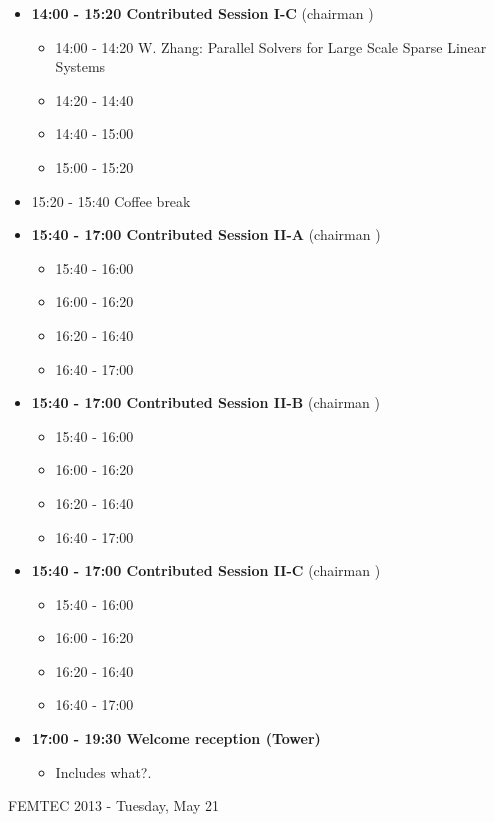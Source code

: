 \documentclass[10pt, A4]{article}%
\begin{document}
\begin{itemize}
\begin{itemize}
  \end{itemize}
    \item {\bf 14:00 - 15:20 Contributed Session I-C} (chairman ) 
  \begin{itemize}
    \item 14:00 - 14:20 {W. Zhang}: {Parallel Solvers for Large Scale Sparse Linear Systems}
    \item 14:20 - 14:40 
    \item 14:40 - 15:00 
    \item 15:00 - 15:20 
  \end{itemize}
  \item 15:20 - 15:40 Coffee break
  \item {\bf 15:40 - 17:00 Contributed Session II-A} (chairman ) 
  \begin{itemize}
    \item 15:40 - 16:00
    \item 16:00 - 16:20 
    \item 16:20 - 16:40 
    \item 16:40 - 17:00 
  \end{itemize}
  \item {\bf 15:40 - 17:00 Contributed Session II-B} (chairman ) 
  \begin{itemize}
    \item 15:40 - 16:00
    \item 16:00 - 16:20 
    \item 16:20 - 16:40 
    \item 16:40 - 17:00 
  \end{itemize}
    \item {\bf 15:40 - 17:00 Contributed Session II-C} (chairman ) 
  \begin{itemize}
    \item 15:40 - 16:00
    \item 16:00 - 16:20 
    \item 16:20 - 16:40 
    \item 16:40 - 17:00 
  \end{itemize}    
  \item {\bf 17:00 - 19:30 Welcome reception (Tower)} 
  \begin{itemize}
     \item Includes what?.
  \end{itemize}
\end{itemize}

\newpage

\centerline{\huge FEMTEC 2013 - Tuesday, May 21}
\vspace{4mm}
\end{document}

